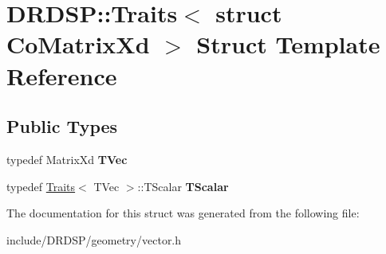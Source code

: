 \hypertarget{struct_d_r_d_s_p_1_1_traits_3_01struct_01_co_matrix_xd_01_4}{\section{D\-R\-D\-S\-P\-:\-:Traits$<$ struct Co\-Matrix\-Xd $>$ Struct Template Reference}
\label{struct_d_r_d_s_p_1_1_traits_3_01struct_01_co_matrix_xd_01_4}
}
\subsection*{Public Types}
\begin{DoxyCompactItemize}
\item 
\hypertarget{struct_d_r_d_s_p_1_1_traits_3_01struct_01_co_matrix_xd_01_4_a6702092e83b4ea57cdaa6ab3ba3c9819}{typedef Matrix\-Xd {\bfseries T\-Vec}}\label{struct_d_r_d_s_p_1_1_traits_3_01struct_01_co_matrix_xd_01_4_a6702092e83b4ea57cdaa6ab3ba3c9819}

\item 
\hypertarget{struct_d_r_d_s_p_1_1_traits_3_01struct_01_co_matrix_xd_01_4_ac5c1214e7dbb6927ad7edccb2e5ee12f}{typedef \hyperlink{struct_d_r_d_s_p_1_1_traits}{Traits}$<$ T\-Vec $>$\-::T\-Scalar {\bfseries T\-Scalar}}\label{struct_d_r_d_s_p_1_1_traits_3_01struct_01_co_matrix_xd_01_4_ac5c1214e7dbb6927ad7edccb2e5ee12f}

\end{DoxyCompactItemize}


The documentation for this struct was generated from the following file\-:\begin{DoxyCompactItemize}
\item 
include/\-D\-R\-D\-S\-P/geometry/vector.\-h\end{DoxyCompactItemize}
